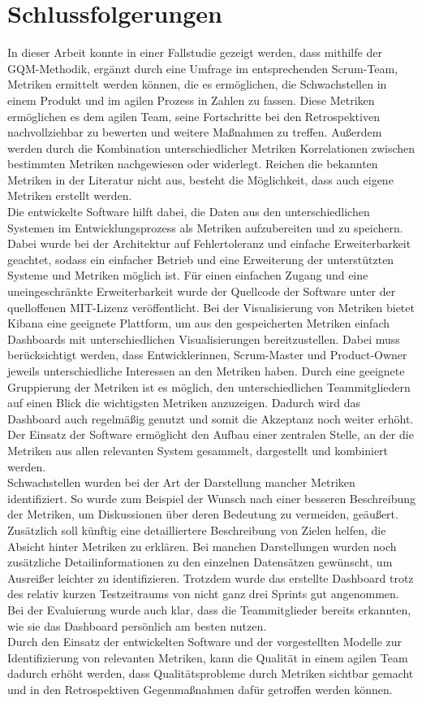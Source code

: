 \chapter{Schlussfolgerungen}

In dieser Arbeit konnte in einer Fallstudie gezeigt werden, dass mithilfe der \ac{GQM}-Methodik, ergänzt durch eine Umfrage im entsprechenden Scrum-Team, Metriken ermittelt werden können, die es ermöglichen, die Schwachstellen in einem Produkt und im agilen Prozess in Zahlen zu fassen.
Diese Metriken ermöglichen es dem agilen Team, seine Fortschritte bei den Retrospektiven nachvollziehbar zu bewerten und weitere Maßnahmen zu treffen.
Außerdem werden durch die Kombination unterschiedlicher Metriken Korrelationen zwischen bestimmten Metriken nachgewiesen oder widerlegt.
Reichen die bekannten Metriken in der Literatur nicht aus, besteht die Möglichkeit, dass auch eigene Metriken erstellt werden.
\\
Die entwickelte Software hilft dabei, die Daten aus den unterschiedlichen Systemen im Entwicklungsprozess als Metriken aufzubereiten und zu speichern.
Dabei wurde bei der Architektur auf Fehlertoleranz und einfache Erweiterbarkeit geachtet, sodass ein einfacher Betrieb und eine Erweiterung der unterstützten Systeme und Metriken möglich ist.
Für einen einfachen Zugang und eine uneingeschränkte Erweiterbarkeit wurde der Quellcode der Software unter der quelloffenen MIT-Lizenz veröffentlicht.
Bei der Visualisierung von Metriken bietet Kibana eine geeignete Plattform, um aus den gespeicherten Metriken einfach Dashboards mit unterschiedlichen Visualisierungen bereitzustellen.
Dabei muss berücksichtigt werden, dass Entwicklerinnen, Scrum-Master und Product-Owner jeweils unterschiedliche Interessen an den Metriken haben.
Durch eine geeignete Gruppierung der Metriken ist es möglich, den unterschiedlichen Teammitgliedern auf einen Blick die wichtigsten Metriken anzuzeigen.
Dadurch wird das Dashboard auch regelmäßig genutzt und somit die Akzeptanz noch weiter erhöht.
Der Einsatz der Software ermöglicht den Aufbau einer zentralen Stelle, an der die Metriken aus allen relevanten System gesammelt, dargestellt und kombiniert werden.
\\
Schwachstellen wurden bei der Art der Darstellung mancher Metriken identifiziert.
So wurde zum Beispiel der Wunsch nach einer besseren Beschreibung der Metriken, um Diskussionen über deren Bedeutung zu vermeiden, geäußert.
Zusätzlich soll künftig eine detailliertere Beschreibung von Zielen helfen, die Absicht hinter Metriken zu erklären.
Bei manchen Darstellungen wurden noch zusätzliche Detailinformationen zu den einzelnen Datensätzen gewünscht, um Ausreißer leichter zu identifizieren.
Trotzdem wurde das erstellte Dashboard trotz des relativ kurzen Testzeitraums von nicht ganz drei Sprints gut angenommen.
Bei der Evaluierung wurde auch klar, dass die Teammitglieder bereits erkannten, wie sie das Dashboard persönlich am besten nutzen.
\\
Durch den Einsatz der entwickelten Software und der vorgestellten Modelle zur Identifizierung von relevanten Metriken, kann die Qualität in einem agilen Team dadurch erhöht werden, dass Qualitätsprobleme durch Metriken sichtbar gemacht und in den Retrospektiven Gegenmaßnahmen dafür getroffen werden können.
